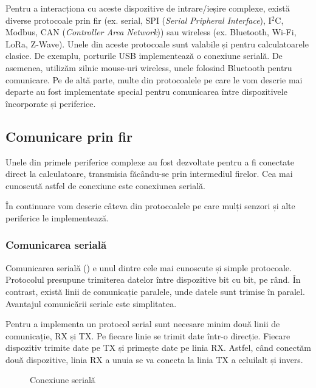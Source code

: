 Pentru a interacționa cu aceste dispozitive de intrare/ieșire complexe, există
diverse protocoale prin fir (ex. serial, SPI (\textit{Serial Pripheral Interface}), I$^2$C, Modbus, CAN (\textit{Controller Area Network})) sau wireless
(ex. Bluetooth, Wi-Fi, LoRa, Z-Wave). Unele din aceste protocoale sunt valabile
și pentru calculatoarele clasice. De exemplu, porturile USB implementează o
conexiune serială. De asemenea, utilizăm zilnic mouse-uri wireless, unele
folosind Bluetooth pentru comunicare. Pe de altă parte, multe din protocoalele pe care
le vom descrie mai departe au fost implementate special pentru comunicarea între
dispozitivele încorporate și periferice.

\subsection{Comunicare prin fir}
\label{sec:embed:bus:wired}

Unele din primele periferice complexe au fost dezvoltate pentru a fi conectate
direct la calculatoare, transmisia făcându-se prin intermediul firelor. Cea mai
cunoscută astfel de conexiune este conexiunea serială.

În continuare vom descrie câteva din protocoalele pe care mulți senzori și alte
periferice le implementează.

\subsubsection{Comunicarea serială}
\label{sec:embed:bus:wired:serial}

Comunicarea serială () e unul dintre cele mai cunoscute și simple protocoale.
Protocolul presupune trimiterea datelor între dispozitive bit cu bit, pe rând.
În contrast, există linii de comunicație paralele, unde datele sunt trimise în
paralel. Avantajul comunicării seriale este simplitatea.

Pentru a implementa un protocol serial sunt necesare minim două linii de
comunicație, RX și TX. Pe fiecare linie se trimit date într-o direcție. Fiecare
dispozitiv trimite date pe TX și primește date pe linia RX. Astfel, când
conectăm două dispozitive, linia RX a unuia se va conecta la linia TX a
celuilalt și invers.

\begin{figure}[htbp]
	\centering
	\def\svgwidth{\columnwidth}
        
	\caption{Conexiune serială}
	\label{fig:embed:serial}
\end{figure}

